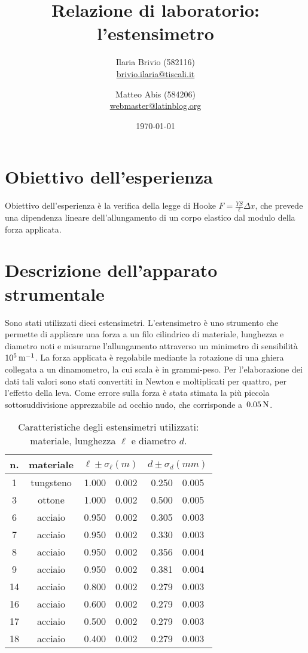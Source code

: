 \documentclass[italian,a4paper]{article}
\begin{document}
\title{Relazione di laboratorio: l'estensimetro}
\author{\normalsize Ilaria Brivio (582116)\\%
\normalsize \url{brivio.ilaria@tiscali.it}%
\and %
\normalsize Matteo Abis (584206)\\ %
\normalsize \url{webmaster@latinblog.org}}
\date{\today}
\maketitle
\section{Obiettivo dell'esperienza}
Obiettivo dell'esperienza è la verifica della legge di Hooke $F = \frac{YS}{\ell} \Delta x$, che prevede una dipendenza lineare dell'allungamento di un corpo elastico dal modulo della forza applicata.
\section{Descrizione dell'apparato strumentale}
Sono stati utilizzati dieci estensimetri.
L'estensimetro è uno strumento che permette di applicare una forza a un filo cilindrico di materiale,
lunghezza e diametro noti e misurarne l'allungamento attraverso un minimetro di sensibilità~$\unit[10^5]{m^{-1}}$. La forza applicata è regolabile mediante la rotazione di una ghiera collegata a un dinamometro, la cui scala è in grammi-peso.
Per l'elaborazione dei dati tali valori sono stati convertiti in Newton e moltiplicati per quattro, per l'effetto della leva. Come errore sulla forza è stata stimata la più piccola sottosuddivisione apprezzabile ad occhio nudo, che corrisponde a~$\unit[0.05]{N}$.
\begin{table}[h]\caption{Caratteristiche degli estensimetri utilizzati: materiale, lunghezza $\ell$ e diametro $d$.}
\centering
 \begin{tabular}{*2c *2{r@{$\pm$}l}}
  n. & materiale & \multicolumn{2}{c}{$\ell \pm \sigma_\ell (\unit{m})$} & \multicolumn{2}{c}{$d \pm \sigma_d (\unit{mm})$}\\\hline
1 & tungsteno & 1.000 & 0.002 &0.250&0.005\\
3 & ottone & 1.000 & 0.002 &0.500&0.005\\
6 & acciaio & 0.950 & 0.002 &0.305&0.003\\
7 & acciaio & 0.950 & 0.002 &0.330&0.003\\
8 & acciaio & 0.950 & 0.002 &0.356&0.004\\
9 & acciaio & 0.950 & 0.002 &0.381&0.004\\
14 & acciaio & 0.800 & 0.002 &0.279&0.003\\
16 & acciaio & 0.600 & 0.002 &0.279&0.003\\
17 & acciaio & 0.500 & 0.002 &0.279&0.003\\
18 & acciaio & 0.400 & 0.002 &0.279&0.003
 \end{tabular}
\end{table}
\end{document}

